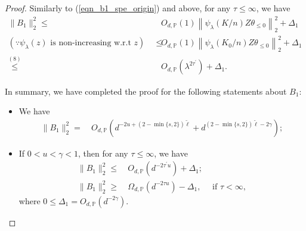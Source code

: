 \documentclass{article}
\theoremstyle{plain}
\theoremstyle{definition}
\theoremstyle{remark}
\newcommand{\rem}{\psi_\lambda}
\newcommand{\green}{\color{green}}
\begin{document}
\begin{appendix}
\begin{proof}



Similarly to (\ref{eqn_b1_spe_origin}) and above, for any $\tau \leq \infty$, we have
\begin{equation*}
    \begin{aligned}
        \|B_{1}\|_{2}^{2} \leq &~  O_{d, \mathbb{P}}\left(1\right)\left\| \rem(K/n)
                Z\theta_{\leq 0} \right\|_{2}^{2} + \Delta_1\\
        (\because \rem(z) \text{ is non-increasing  w.r.t } z)\quad \leq&~
        O_{d, \mathbb{P}}\left(1\right)\left\| \rem(K_{0}/n)
                Z\theta_{\leq 0} \right\|_{2}^{2} + \Delta_1\\
                \overset{(8)}{\leq} &~
                O_{d, \mathbb{P}}\left(  \lambda^{2\tau^{\prime}} \right) + \Delta_1.
    \end{aligned}
\end{equation*}








In summary, we have completed the proof for the following statements about $B_{1}$:
\begin{itemize}
    \item We have
    \begin{equation}\label{eqn_bound_B_1_spe}
    \begin{aligned}
                \|B_1\|_{2}^{2}  =&~ 
                O_{d, \mathbb{P}}\left(d^{-2u + (2-\min\{s, 2\})\tilde{\ell} } + d^{(2-\min\{s, 2\})\tilde{\ell}-2\gamma }\right);
    \end{aligned}
\end{equation}

    \item If $0 < u < \gamma <1$, then for any $\tau \leq \infty$, we have
    \begin{equation*}
    \begin{aligned}
                \|B_1\|_{2}^{2}  \leq &~ 
                O_{d, \mathbb{P}}\left(  d^{-2\tau^{\prime} u} \right) + \Delta_1;\\
                \|B_1\|_{2}^{2}  \geq &~ 
                \Omega_{d, \mathbb{P}}\left(  d^{-2\tau u} \right)- \Delta_1, \quad \text{ if } \tau<\infty,
    \end{aligned}
\end{equation*}
where $0 \leq \Delta_1 = O_{d, \mathbb{P}}\left( d^{-2\gamma }\right)$.


\end{itemize}
\end{proof}
\end{appendix}
\end{document}
